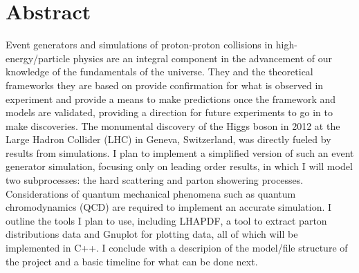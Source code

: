 \section*{Abstract}

Event generators and simulations of proton-proton collisions in high-energy/particle physics are an integral component in the advancement of our knowledge of the fundamentals of the universe. They and the theoretical frameworks they are based on provide confirmation for what is observed in experiment and provide a means to make predictions once the framework and models are validated, providing a direction for future experiments to go in to make discoveries. The monumental discovery of the Higgs boson in 2012 at the Large Hadron Collider (LHC) in Geneva, Switzerland, was directly fueled by results from simulations. I plan to implement a simplified version of such an event generator simulation, focusing only on leading order results, in which I will model two subprocesses: the hard scattering and parton showering processes. Considerations of quantum mechanical phenomena such as quantum chromodynamics (QCD) are required to implement an accurate simulation. I outline the tools I plan to use, including \textsc{LHAPDF}, a tool to extract parton distributions data and Gnuplot for plotting data, all of which will be implemented in C++. I conclude with a descripion of the model/file structure of the project and a basic timeline for what can be done next.

